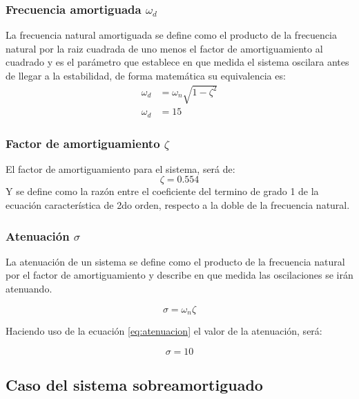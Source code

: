 \documentclass[conference]{IEEEtran}
\begin{document}
	\subsubsection{Frecuencia amortiguada $\omega_d$}
	
	La frecuencia natural amortiguada se define como el producto de la frecuencia natural por la raiz cuadrada de uno menos el factor de amortiguamiento al cuadrado y es el parámetro que establece en que medida el sistema oscilara antes de llegar a la estabilidad, de forma matemática su equivalencia es:
	\begin{align}
		\omega_d &= \omega_n \sqrt{1 - \zeta^2} \\
		\omega_d &= 15
	\end{align}
	
	\subsubsection{Factor de amortiguamiento $\zeta$}
	El factor de amortiguamiento para el sistema, será de: 
	\begin{equation}
		\zeta = 0.554
		\label{eq:sub-factor-amortiguamiento}
	\end{equation}
	Y se define como la razón entre el coeficiente del termino de grado 1 de la ecuación característica de 2do orden, respecto a la doble de la frecuencia natural.
	
	\subsubsection{Atenuación $\sigma$}
	La atenuación de un sistema se define como el producto de la frecuencia natural por el factor de amortiguamiento y describe en que medida las oscilaciones se irán atenuando.
	
	\begin{equation}
		\sigma = \omega_n \zeta
		\label{eq:atenuacion}
	\end{equation}
	
	Haciendo uso de la ecuación \ref{eq:atenuacion} el valor de la atenuación, será:
	
	\begin{equation}
		\sigma = 10
	\end{equation}
	
	\subsection{Caso del sistema sobreamortiguado}
	
\end{document}
